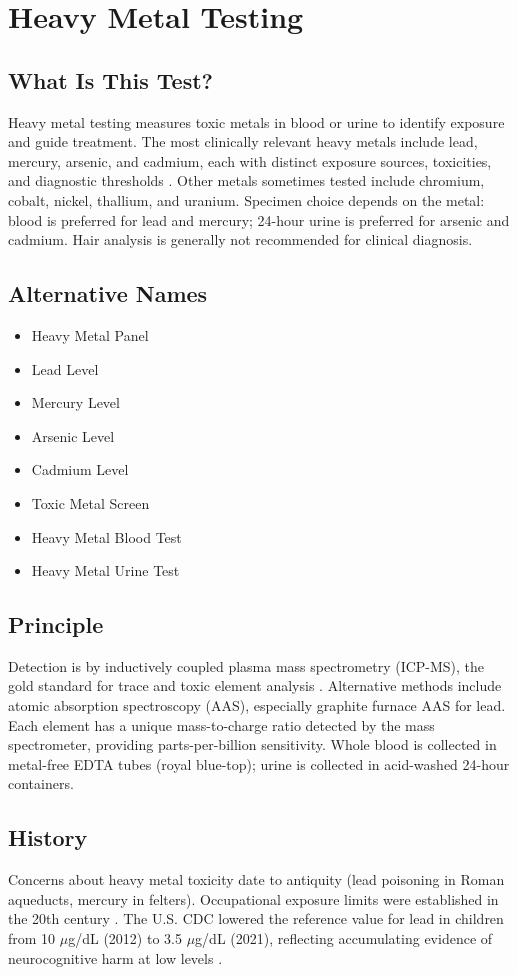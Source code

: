 \chapter{Heavy Metal Testing}

\section*{What Is This Test?}
Heavy metal testing measures toxic metals in blood or urine to identify exposure and guide treatment. The most clinically relevant heavy metals include lead, mercury, arsenic, and cadmium, each with distinct exposure sources, toxicities, and diagnostic thresholds \cite{kosnett2024heavy}. Other metals sometimes tested include chromium, cobalt, nickel, thallium, and uranium. Specimen choice depends on the metal: blood is preferred for lead and mercury; 24-hour urine is preferred for arsenic and cadmium. Hair analysis is generally not recommended for clinical diagnosis.

\section*{Alternative Names}
\begin{itemize}
  \item Heavy Metal Panel
  \item Lead Level
  \item Mercury Level
  \item Arsenic Level
  \item Cadmium Level
  \item Toxic Metal Screen
  \item Heavy Metal Blood Test
  \item Heavy Metal Urine Test
\end{itemize}
\section*{Principle}
Detection is by inductively coupled plasma mass spectrometry (ICP-MS), the gold standard for trace and toxic element analysis \cite{nordberg2022handbook}. Alternative methods include atomic absorption spectroscopy (AAS), especially graphite furnace AAS for lead. Each element has a unique mass-to-charge ratio detected by the mass spectrometer, providing parts-per-billion sensitivity. Whole blood is collected in metal-free EDTA tubes (royal blue-top); urine is collected in acid-washed 24-hour containers.

\section*{History}
Concerns about heavy metal toxicity date to antiquity (lead poisoning in Roman aqueducts, mercury in felters). Occupational exposure limits were established in the 20th century \cite{osha2024heavy}. The U.S. CDC lowered the reference value for lead in children from 10 $\mu$g/dL (2012) to 3.5 $\mu$g/dL (2021), reflecting accumulating evidence of neurocognitive harm at low levels \cite{cdc2021bloodlead}.


